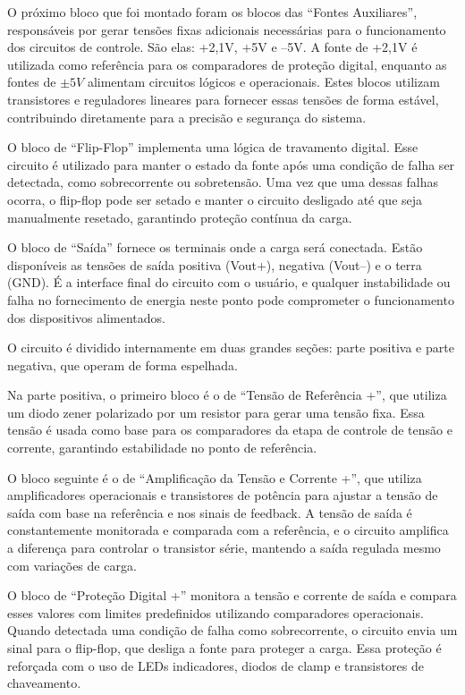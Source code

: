 \documentclass[
	12pt,				%
	oneside,			%
	a4paper,			%
	chapter=TITLE,
	sumario=tradicional,
	english,			%
	brazil				%
]{abntex2}
\begin{document}
O próximo bloco que foi montado foram os blocos das ``Fontes Auxiliares'', responsáveis por gerar tensões fixas adicionais necessárias para o funcionamento dos circuitos de controle. São elas: +2,1V, +5V e –5V. A fonte de +2,1V é utilizada como referência para os comparadores de proteção digital, enquanto as fontes de \(\pm5V\) alimentam circuitos lógicos e operacionais. Estes blocos utilizam transistores e reguladores lineares para fornecer essas tensões de forma estável, contribuindo diretamente para a precisão e segurança do sistema.

O bloco de ``Flip-Flop'' implementa uma lógica de travamento digital. Esse circuito é utilizado para manter o estado da fonte após uma condição de falha ser detectada, como sobrecorrente ou sobretensão. Uma vez que uma dessas falhas ocorra, o flip-flop pode ser setado e manter o circuito desligado até que seja manualmente resetado, garantindo proteção contínua da carga.

O bloco de ``Saída'' fornece os terminais onde a carga será conectada. Estão disponíveis as tensões de saída positiva (Vout+), negativa (Vout–) e o terra (GND). É a interface final do circuito com o usuário, e qualquer instabilidade ou falha no fornecimento de energia neste ponto pode comprometer o funcionamento dos dispositivos alimentados.

O circuito é dividido internamente em duas grandes seções: parte positiva e parte negativa, que operam de forma espelhada.

Na parte positiva, o primeiro bloco é o de ``Tensão de Referência +'', que utiliza um diodo zener polarizado por um resistor para gerar uma tensão fixa. Essa tensão é usada como base para os comparadores da etapa de controle de tensão e corrente, garantindo estabilidade no ponto de referência.

O bloco seguinte é o de ``Amplificação da Tensão e Corrente +'', que utiliza amplificadores operacionais e transistores de potência para ajustar a tensão de saída com base na referência e nos sinais de feedback. A tensão de saída é constantemente monitorada e comparada com a referência, e o circuito amplifica a diferença para controlar o transistor série, mantendo a saída regulada mesmo com variações de carga.

O bloco de ``Proteção Digital +'' monitora a tensão e corrente de saída e compara esses valores com limites predefinidos utilizando comparadores operacionais. Quando detectada uma condição de falha como sobrecorrente, o circuito envia um sinal para o flip-flop, que desliga a fonte para proteger a carga. Essa proteção é reforçada com o uso de LEDs indicadores, diodos de clamp e transistores de chaveamento.
\end{document}
